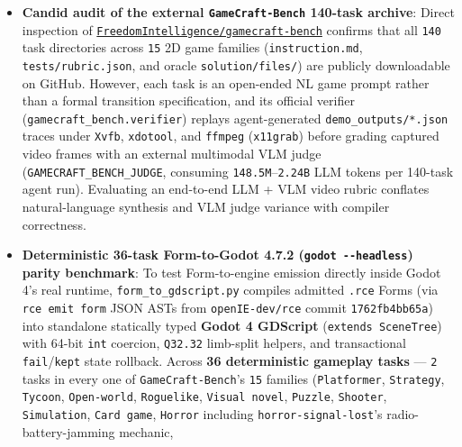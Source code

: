 \documentclass[10pt,letterpaper]{article}
\providecommand{\tightlist}{\setlength{\itemsep}{1pt}\setlength{\parskip}{0pt}}
\begin{document}
\begin{itemize}
\tightlist
\item
  \textbf{Candid audit of the external \texttt{GameCraft-\allowbreak{}Bench} 140-task
  archive}: Direct inspection of
  \href{https://github.com/FreedomIntelligence/gamecraft-bench}{\texttt{FreedomIntelligence/\allowbreak{}gamecraft-\allowbreak{}bench}}
  confirms that all \texttt{140} task directories across \texttt{15} 2D
  game families (\texttt{instruction.\allowbreak{}md}, \texttt{tests/\allowbreak{}rubric.\allowbreak{}json},
  and oracle \texttt{solution/\allowbreak{}files/\allowbreak{}}) are publicly downloadable on
  GitHub. However, each task is an open-ended NL game prompt rather than
  a formal transition specification, and its official verifier
  (\texttt{gamecraft\_\allowbreak{}bench.\allowbreak{}verifier}) replays agent-generated
  \texttt{demo\_\allowbreak{}outputs/\allowbreak{}*.\allowbreak{}json} traces under \texttt{Xvfb},
  \texttt{xdotool}, and \texttt{ffmpeg} (\texttt{x11grab}) before
  grading captured video frames with an external multimodal VLM judge
  (\texttt{GAMECRAFT\_\allowbreak{}BENCH\_\allowbreak{}JUDGE}, consuming
  \texttt{148.5M}--\texttt{2.24B} LLM tokens per 140-task agent run).
  Evaluating an end-to-end LLM + VLM video rubric conflates
  natural-language synthesis and VLM judge variance with compiler
  correctness.
\item
  \textbf{Deterministic 36-task Form-to-Godot 4.7.2
  (\texttt{godot\ -\allowbreak{}\/\allowbreak{}-\allowbreak{}headless}) parity benchmark}: To test
  Form-to-engine emission directly inside Godot 4's real runtime,
  \texttt{form\_\allowbreak{}to\_\allowbreak{}gdscript.\allowbreak{}py} compiles admitted \texttt{.rce} Forms
  (via \texttt{rce\ emit\ form} JSON ASTs from \texttt{openIE-\allowbreak{}dev/\allowbreak{}rce}
  commit \texttt{1762fb4bb65a}) into standalone statically typed
  \textbf{Godot 4 GDScript} (\texttt{extends\ SceneTree}) with 64-bit
  \texttt{int} coercion, \texttt{Q32.32} limb-split helpers, and
  transactional \texttt{fail}/\allowbreak{}\texttt{kept} state rollback. Across
  \textbf{36 deterministic gameplay tasks} --- \texttt{2} tasks in every
  one of \texttt{GameCraft-\allowbreak{}Bench}'s \texttt{15} families
  (\texttt{Platformer}, \texttt{Strategy}, \texttt{Tycoon},
  \texttt{Open-\allowbreak{}world}, \texttt{Roguelike}, \texttt{Visual\ novel},
  \texttt{Puzzle}, \texttt{Shooter}, \texttt{Simulation},
  \texttt{Card\ game}, \texttt{Horror} including
  \texttt{horror-\allowbreak{}signal-\allowbreak{}lost}'s radio-battery-jamming mechanic,

\end{itemize}
\end{document}
